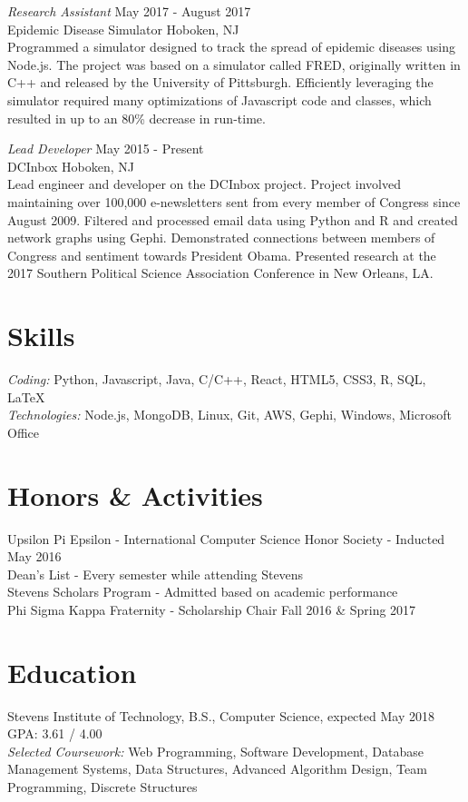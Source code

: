 \documentclass{res}
\begin{document}
{{\sl Research Assistant} \hfill May 2017 - August 2017\\
Epidemic Disease Simulator \hfill Hoboken, NJ \\
Programmed a simulator designed to track the spread of epidemic diseases using Node.js. The project was based on a simulator called FRED, originally  written in C++ and released by the University of Pittsburgh. Efficiently leveraging the simulator required many optimizations of Javascript code and classes, which resulted in up to an 80\% decrease in run-time.

{\sl Lead Developer} \hfill May 2015 - Present \\
DCInbox \hfill Hoboken, NJ \\
Lead engineer and developer on the DCInbox project. Project involved maintaining over 100,000 e-newsletters sent from every member of Congress since August 2009. Filtered and processed email data using Python and R and created network graphs using Gephi. Demonstrated connections between members of Congress and sentiment towards President Obama. Presented research at the 2017 Southern Political Science Association Conference in New Orleans, LA.


\section{\bf\large Skills}
{\sl Coding: } Python, Javascript, Java, C/C++, React, HTML5, CSS3, R, SQL, LaTeX \\
{\sl Technologies:} Node.js, MongoDB, Linux, Git, AWS, Gephi, Windows, Microsoft Office

\section{\bf\large Honors \& Activities}
Upsilon Pi Epsilon - International Computer Science Honor Society - Inducted May 2016\\
Dean's List - Every semester while attending Stevens \\
Stevens Scholars Program - Admitted based on academic performance \\ %
Phi Sigma Kappa Fraternity - Scholarship Chair Fall 2016 \& Spring 2017

\section{\bf\large Education}
Stevens Institute of Technology, B.S., Computer Science, expected May 2018 \hfill GPA: 3.61 / 4.00 \\
{\sl Selected Coursework:} Web Programming, Software Development, Database Management Systems, Data Structures, Advanced Algorithm Design, Team Programming, Discrete Structures

}
\end{document}
